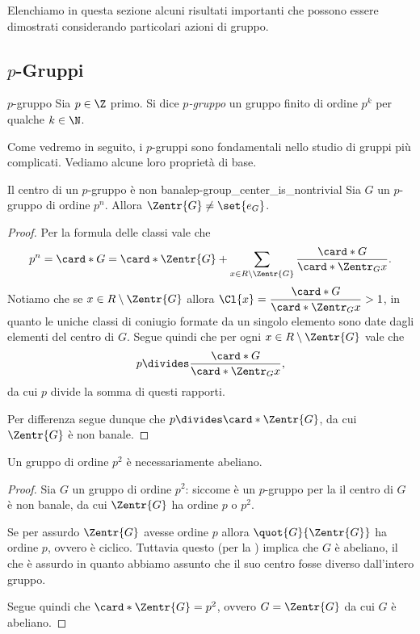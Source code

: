 Elenchiamo in questa sezione alcuni risultati importanti che possono essere dimostrati considerando particolari azioni di gruppo.

\subsection{$p$-Gruppi}

\begin{definition}{$p$-gruppo}{}
    Sia $p \in \Z$ primo. Si dice \emph{$p$-gruppo} un gruppo finito di ordine $p^k$ per qualche $k \in \N$.
\end{definition}

Come vedremo in seguito, i $p$-gruppi sono fondamentali nello studio di gruppi più complicati. Vediamo alcune loro proprietà di base.

\begin{proposition}
    {Il centro di un $p$-gruppo è non banale}{p-group_center_is_nontrivial}
    Sia $G$ un $p$-gruppo di ordine $p^n$. Allora $\Zentr{G} \neq \set{e_G}$.
\end{proposition}
\begin{proof}
    Per la formula delle classi vale che \[
        p^n = \card*{G} = \card*{\Zentr{G}} + \sum_{x \in R \setminus \Zentr{G}} \frac{\card*{G}}{\card*{\Zentr_{G}{x}}}.
    \]
    Notiamo che se $x \in R \setminus \Zentr{G}$ allora $\Cl{x} = \dfrac{\card*{G}}{\card*{\Zentr_{G}{x}}} > 1$, in quanto le uniche classi di coniugio formate da un singolo elemento sono date dagli elementi del centro di $G$. Segue quindi che per ogni $x \in R \setminus \Zentr{G}$ vale che \[
        p \divides \frac{\card*{G}}{\card*{\Zentr_{G}{x}}},
    \] da cui $p$ divide la somma di questi rapporti.

    Per differenza segue dunque che $p \divides \card*{\Zentr{G}}$, da cui $\Zentr{G}$ è non banale.
\end{proof}

\begin{proposition}{}{}
    Un gruppo di ordine $p^2$ è necessariamente abeliano.
\end{proposition}
\begin{proof}
    Sia $G$ un gruppo di ordine $p^2$: siccome è un $p$-gruppo per la  il centro di $G$ è non banale, da cui $\Zentr{G}$ ha ordine $p$ o $p^2$.

    Se per assurdo $\Zentr{G}$ avesse ordine $p$ allora $\quot{G}{\Zentr{G}}$ ha ordine $p$, ovvero è ciclico. Tuttavia questo (per la ) implica che $G$ è abeliano, il che è assurdo in quanto abbiamo assunto che il suo centro fosse diverso dall'intero gruppo.

    Segue quindi che $\card*{\Zentr{G}} = p^2$, ovvero $G = \Zentr{G}$ da cui $G$ è abeliano.
\end{proof}


